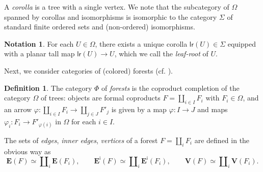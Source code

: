\documentclass[a4paper,10pt]{article}%
\numberwithin{equation}{section}
\numberwithin{figure}{section}
\theoremstyle{definition} %
\newtheorem{definition}[equation]{Definition}%
\newtheorem{notation}[equation]{Notation}%
\newcommand{\1}{\ensuremath{\mathbbm 1}}%
\begin{document}
A \textit{corolla} is a tree with a single vertex.
We note that the subcategory of $\Omega$ spanned by corollas and isomorphisms is isomorphic to the category $\Sigma$ of standard finite ordered sets and (non-ordered) isomorphisms.

\begin{notation}
      \label{LR_NOT}
      For each $U \in \Omega$, there exists a unique corolla $\mathsf{lr}(U) \in \Sigma$ equipped with a planar tall map $\mathsf{lr}(U) \to U$,
      which we call the \textit{leaf-root} of $U$.
\end{notation}



Next, we consider categories of (colored) forests (cf. \cite[Defn. 2.56]{BP_HGOP}).

\begin{definition}
      The category $\Phi$ of \textit{forests} is the coproduct completion of the category $\Omega$ of trees:
      objects are formal coproducts 
      $F = \amalg_{i \in I} F_i$ with $F_i \in \Omega$,
      and an arrow 
      $\varphi \colon \amalg_{i \in I} F_i \to
      \amalg_{j \in J} F'_j$ is given by
      a map $\varphi \colon I \to J$ and
      maps $\varphi_i \colon F_i \to F'_{\varphi(i)}$ in $\Omega$ for each $i \in I$.

The sets of \emph{edges}, \emph{inner edges}, \emph{vertices}
of a forest $F = \amalg_i F_i$
are defined in the obvious way as
\[
	\boldsymbol{E}(F)
	\simeq
	\amalg_i \boldsymbol{E}(F_i),
\qquad
	\boldsymbol{E}^{\mathsf{i}}(F)
	\simeq
	\amalg_i \boldsymbol{E}^{\mathsf{i}}(F_i),
\qquad
	\boldsymbol{V}(F)
	\simeq
	\amalg_i \boldsymbol{V}(F_i).
\]
\end{definition}
\end{document}
